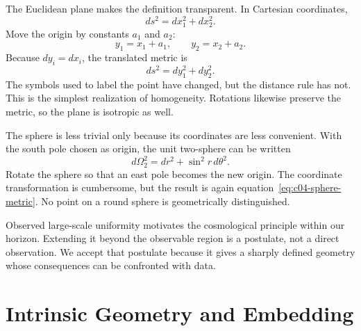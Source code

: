 The Euclidean plane makes the definition transparent. In Cartesian coordinates,
\begin{equation}
ds^2=dx_1^2+dx_2^2.
\label{eq:c04-flat-metric}
\end{equation}
Move the origin by constants \(a_1\) and \(a_2\):
\begin{equation}
y_1=x_1+a_1,
\qquad
y_2=x_2+a_2.
\label{eq:c04-flat-translation}
\end{equation}
Because \(dy_i=dx_i\), the translated metric is
\begin{equation}
ds^2=dy_1^2+dy_2^2.
\end{equation}
The symbols used to label the point have changed, but the distance rule has not. This is the simplest realization of homogeneity. Rotations likewise preserve the metric, so the plane is isotropic as well.

The sphere is less trivial only because its coordinates are less convenient. With the south pole chosen as origin, the unit two-sphere can be written
\begin{equation}
d\Omega_2^2=dr^2+\sin^2 r\,d\theta^2.
\label{eq:c04-sphere-metric}
\end{equation}
Rotate the sphere so that an east pole becomes the new origin. The coordinate transformation is cumbersome, but the result is again equation~\eqref{eq:c04-sphere-metric}. No point on a round sphere is geometrically distinguished.

\begin{classroomqa}
\end{classroomqa}

Observed large-scale uniformity motivates the cosmological principle within our horizon. Extending it beyond the observable region is a postulate, not a direct observation. We accept that postulate because it gives a sharply defined geometry whose consequences can be confronted with data.

\section{Intrinsic Geometry and Embedding}

